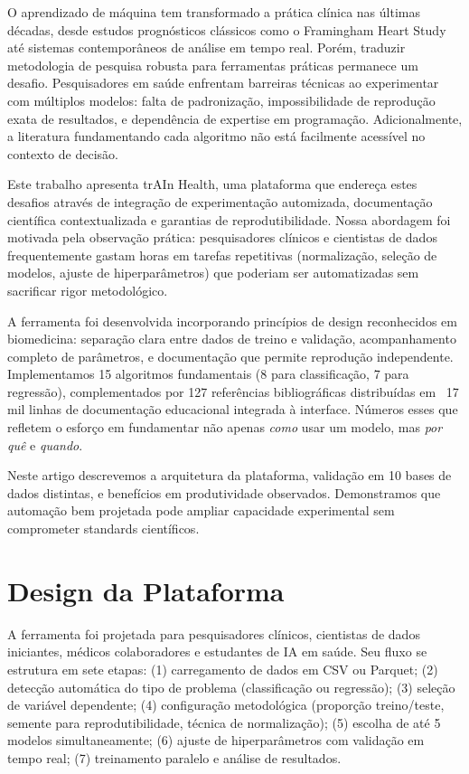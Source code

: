 \documentclass[12pt]{article}
\begin{document}
O aprendizado de máquina tem transformado a prática clínica nas últimas décadas, desde estudos prognósticos clássicos como o Framingham Heart Study até sistemas contemporâneos de análise em tempo real. Porém, traduzir metodologia de pesquisa robusta para ferramentas práticas permanece um desafio. Pesquisadores em saúde enfrentam barreiras técnicas ao experimentar com múltiplos modelos: falta de padronização, impossibilidade de reprodução exata de resultados, e dependência de expertise em programação. Adicionalmente, a literatura fundamentando cada algoritmo não está facilmente acessível no contexto de decisão.

Este trabalho apresenta trAIn Health, uma plataforma que endereça estes desafios através de integração de experimentação automizada, documentação científica contextualizada e garantias de reprodutibilidade. Nossa abordagem foi motivada pela observação prática: pesquisadores clínicos e cientistas de dados frequentemente gastam horas em tarefas repetitivas (normalização, seleção de modelos, ajuste de hiperparâmetros) que poderiam ser automatizadas sem sacrificar rigor metodológico.

A ferramenta foi desenvolvida incorporando princípios de design reconhecidos em biomedicina: separação clara entre dados de treino e validação, acompanhamento completo de parâmetros, e documentação que permite reprodução independente. Implementamos 15 algoritmos fundamentais (8 para classificação, 7 para regressão), complementados por 127 referências bibliográficas distribuídas em ~17 mil linhas de documentação educacional integrada à interface. Números esses que refletem o esforço em fundamentar não apenas \textit{como} usar um modelo, mas \textit{por quê} e \textit{quando}.

Neste artigo descrevemos a arquitetura da plataforma, validação em 10 bases de dados distintas, e benefícios em produtividade observados. Demonstramos que automação bem projetada pode ampliar capacidade experimental sem comprometer standards científicos.

\section{Design da Plataforma}

A ferramenta foi projetada para pesquisadores clínicos, cientistas de dados iniciantes, médicos colaboradores e estudantes de IA em saúde. Seu fluxo se estrutura em sete etapas: (1) carregamento de dados em CSV ou Parquet; (2) detecção automática do tipo de problema (classificação ou regressão); (3) seleção de variável dependente; (4) configuração metodológica (proporção treino/teste, semente para reprodutibilidade, técnica de normalização); (5) escolha de até 5 modelos simultaneamente; (6) ajuste de hiperparâmetros com validação em tempo real; (7) treinamento paralelo e análise de resultados.
\end{document}
